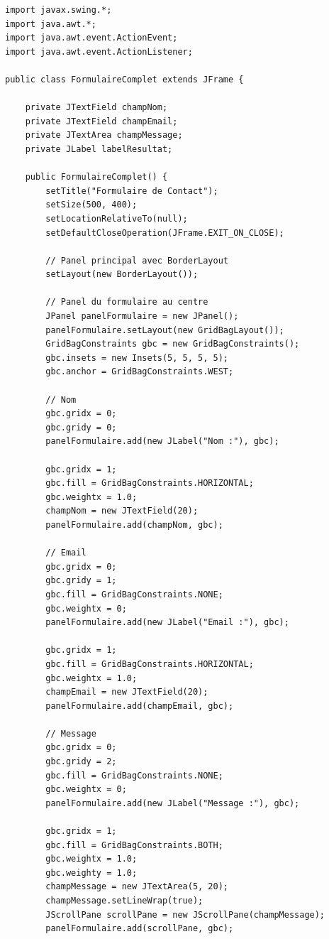 \documentclass[11pt,a4paper]{article}
\begin{document}
\begin{lstlisting}
import javax.swing.*;
import java.awt.*;
import java.awt.event.ActionEvent;
import java.awt.event.ActionListener;

public class FormulaireComplet extends JFrame {
    
    private JTextField champNom;
    private JTextField champEmail;
    private JTextArea champMessage;
    private JLabel labelResultat;
    
    public FormulaireComplet() {
        setTitle("Formulaire de Contact");
        setSize(500, 400);
        setLocationRelativeTo(null);
        setDefaultCloseOperation(JFrame.EXIT_ON_CLOSE);
        
        // Panel principal avec BorderLayout
        setLayout(new BorderLayout());
        
        // Panel du formulaire au centre
        JPanel panelFormulaire = new JPanel();
        panelFormulaire.setLayout(new GridBagLayout());
        GridBagConstraints gbc = new GridBagConstraints();
        gbc.insets = new Insets(5, 5, 5, 5);
        gbc.anchor = GridBagConstraints.WEST;
        
        // Nom
        gbc.gridx = 0;
        gbc.gridy = 0;
        panelFormulaire.add(new JLabel("Nom :"), gbc);
        
        gbc.gridx = 1;
        gbc.fill = GridBagConstraints.HORIZONTAL;
        gbc.weightx = 1.0;
        champNom = new JTextField(20);
        panelFormulaire.add(champNom, gbc);
        
        // Email
        gbc.gridx = 0;
        gbc.gridy = 1;
        gbc.fill = GridBagConstraints.NONE;
        gbc.weightx = 0;
        panelFormulaire.add(new JLabel("Email :"), gbc);
        
        gbc.gridx = 1;
        gbc.fill = GridBagConstraints.HORIZONTAL;
        gbc.weightx = 1.0;
        champEmail = new JTextField(20);
        panelFormulaire.add(champEmail, gbc);
        
        // Message
        gbc.gridx = 0;
        gbc.gridy = 2;
        gbc.fill = GridBagConstraints.NONE;
        gbc.weightx = 0;
        panelFormulaire.add(new JLabel("Message :"), gbc);
        
        gbc.gridx = 1;
        gbc.fill = GridBagConstraints.BOTH;
        gbc.weightx = 1.0;
        gbc.weighty = 1.0;
        champMessage = new JTextArea(5, 20);
        champMessage.setLineWrap(true);
        JScrollPane scrollPane = new JScrollPane(champMessage);
        panelFormulaire.add(scrollPane, gbc);
        

\end{lstlisting}
\end{document}
